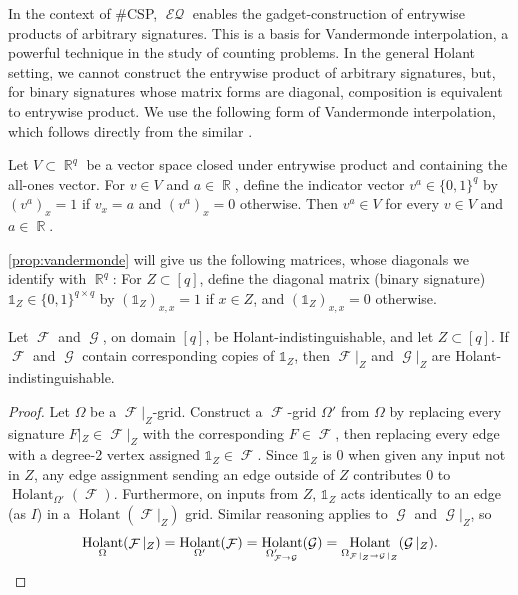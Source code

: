 \documentclass{article}
\DeclareMathOperator{\rr}{\mathbb{R}}
\DeclareMathOperator{\fc}{\mathcal{F}}
\DeclareMathOperator{\gc}{\mathcal{G}}
\DeclareMathOperator{\holant}{Holant}
\DeclareMathOperator{\eq}{\mathcal{EQ}}
\begin{document}
In the context of \#CSP, $\eq$ enables the gadget-construction of entrywise 
products of arbitrary signatures. This is a basis for Vandermonde interpolation, a powerful 
technique in the study of counting problems.
In the general Holant setting, we cannot construct the entrywise product of arbitrary signatures,
but, for binary signatures whose matrix forms are diagonal, composition is equivalent to entrywise
product. We use the following form of Vandermonde interpolation, which follows directly from the similar
\cite[Lemma 2.3]{grohe_homomorphism_2022}.
\begin{proposition}
    \label{prop:vandermonde}
    Let $V \subset \rr^q$ be a vector space closed under entrywise product and containing the
    all-ones vector. For $v \in V$ and $a \in \rr$, define the indicator vector $v^a \in \{0,1\}^q$ by
    $(v^a)_x = 1$ if $v_x = a$ and $(v^a)_x = 0$ otherwise. Then $v^a \in V$ for every
    $v \in V$ and $a \in \rr$.
\end{proposition}
\autoref{prop:vandermonde} will give us the following matrices, whose diagonals we identify
with $\rr^q$:
For $Z \subset [q]$, define the diagonal matrix (binary signature)
$\mathds{1}_Z \in \{0,1\}^{q \times q}$ by $(\mathds{1}_Z)_{x,x} = 1$ if $x \in Z$, and $(\mathds{1}_Z)_{x,x} = 0$ otherwise.
\begin{lemma}
    \label{lem:restriction}
    Let $\fc$ and $\gc$, on domain $[q]$, be Holant-indistinguishable, and let $Z \subset [q]$. If $\fc$ and
    $\gc$ contain corresponding copies of $\mathds{1}_Z$, then $\fc|_Z$ and $\gc|_Z$ are 
    Holant-indistinguishable.
\end{lemma}
\begin{proof}
    Let $\Omega$ be a $\fc|_Z$-grid.
    Construct a $\fc$-grid $\Omega'$ from $\Omega$ by replacing every signature
    $F|_Z \in \fc|_Z$ with the corresponding $F \in \fc$, then replacing every edge with a degree-2 vertex
    assigned 
    $\mathds{1}_Z \in \fc$. Since $\mathds{1}_Z$ is 0 when given any input not in $Z$,
    any edge assignment sending an edge outside of $Z$ contributes 0 to
    $\holant_{\Omega'}(\fc)$. Furthermore, on inputs from $Z$, $\mathds{1}_Z$ acts identically to an 
    edge (as $I$) in a $\holant(\fc|_Z)$ grid.
    Similar reasoning applies to $\gc$ and $\gc|_Z$, so
    \[
        \holant_{\Omega}(\fc|_Z) = \holant_{\Omega'}(\fc) = \holant_{\Omega'_{\fc\to\gc}}(\gc) 
        =\holant_{\Omega_{\fc|_Z\to\gc|_Z}}(\gc|_Z). \qedhere
    \]
\end{proof}
\end{document}

